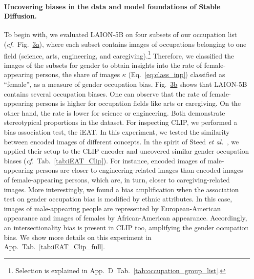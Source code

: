 \documentclass{article}%
\newcommand{\cf}{\emph{cf.}~}
\newcommand{\etal}{\emph{et al.}~}
\begin{document}
\paragraph{Uncovering biases in the data and model foundations of Stable Diffusion.}
To begin with, we evaluated LAION-5B on four subsets of our occupation list (\cf Fig.~\hyperref[fig:dataset-stats]{3a}), where each subset contains images of occupations belonging to one field (science, arts, engineering, and caregiving).\footnote{Selection is explained in App.~D~Tab.~\ref{tab:occupation_group_list}.} Therefore, we classified the images of the subsets for gender to obtain insights into the rate of female-appearing persons, the share of images $\kappa$ (Eq.~\ref{eq:class_inp}) classified as ``female'', as a measure of gender occupation bias. 
Fig.~\hyperref[fig:dataset-stats]{3b} shows that LAION-5B contains several occupation biases.
One can observe that the rate of female-appearing persons is higher for occupation fields like arts or caregiving. On the other hand, the rate is lower for science or engineering. Both demonstrate stereotypical proportions in the dataset.
For inspecting CLIP, we performed a bias association test, the iEAT. In this experiment, we tested the similarity between encoded images of different concepts. In the spirit of Steed \etal \cite{steed21image}, we applied their setup to the CLIP encoder and uncovered similar gender occupation biases (\cf Tab.~\ref{tab:iEAT_Clip}). %
For instance, encoded images of male-appearing persons are closer to engineering-related images than encoded images of female-appearing persons, which are, in turn, closer to caregiving-related images. More interestingly, we found a bias amplification when the association test on gender occupation bias is modified by ethnic attributes. In this case, images of male-appearing people are represented by European-American appearance and images of females by African-American appearance. Accordingly, an intersectionality bias \cite{wang22intersectionality} is present in CLIP too, amplifying the gender occupation bias.
We show more details on this experiment in App.~Tab.~\ref{tab:iEAT_Clip_full}.
\end{document}
